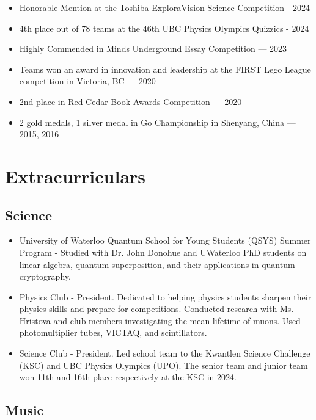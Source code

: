 \documentclass{article}
\begin{document}
\begin{itemize}
	\item Honorable Mention at the Toshiba ExploraVision Science Competition - 2024
	\item 4th place out of 78 teams at the 46th UBC Physics Olympics Quizzics - 2024
	\item Highly Commended in Minds Underground Essay Competition — 2023
	\item Teams won an award in innovation and leadership at the FIRST Lego League competition in Victoria, BC — 2020
	\item 2nd place in Red Cedar Book Awards Competition — 2020
	\item 2 gold medals, 1 silver medal in Go Championship in Shenyang, China — 2015, 2016
\end{itemize}

\section*{Extracurriculars}

\subsection*{Science}

\begin{itemize}
	\item University of Waterloo Quantum School for Young Students (QSYS) Summer Program - Studied with Dr. John Donohue and UWaterloo PhD students on linear algebra, quantum superposition, and their applications in quantum cryptography.
	\item Physics Club - President. Dedicated to helping physics students sharpen their physics skills and prepare for competitions. Conducted research with Ms. Hristova and club members investigating the mean lifetime of muons. Used photomultiplier tubes, VICTAQ, and scintillators.
	\item Science Club - President. Led school team to the Kwantlen Science Challenge (KSC) and UBC Physics Olympics (UPO). The senior team and junior team won 11th and 16th place respectively at the KSC in 2024.
\end{itemize}

\subsection*{Music}
\end{document}
